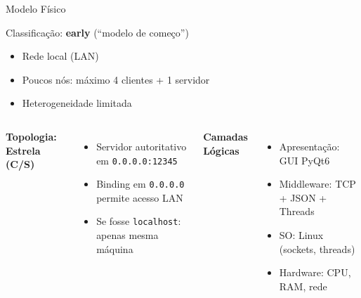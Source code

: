 \documentclass[aspectratio=169]{beamer}
\begin{document}
\begin{frame}{Modelo F\'isico}
  \begin{block}{Classifica\c{c}\~ao: \textbf{early} (``modelo de come\c{c}o'')}
    \begin{itemize}
      \item Rede local (LAN)
      \item Poucos n\'os: m\'aximo 4 clientes + 1 servidor
      \item Heterogeneidade limitada
    \end{itemize}
  \end{block}

  \vfill
  \begin{columns}
    \textbf{Topologia: Estrela (C/S)}
    \begin{itemize}
      \item Servidor autoritativo em \texttt{0.0.0.0:12345}
      \item Binding em \texttt{0.0.0.0} permite acesso LAN
      \item Se fosse \texttt{localhost}: apenas mesma m\'aquina
    \end{itemize}
    \textbf{Camadas L\'ogicas}
    \begin{itemize}
      \item Apresenta\c{c}\~ao: GUI PyQt6
      \item Middleware: TCP + JSON + Threads
      \item SO: Linux (sockets, threads)
      \item Hardware: CPU, RAM, rede
    \end{itemize}
  \end{columns}
\end{frame}
\end{document}
